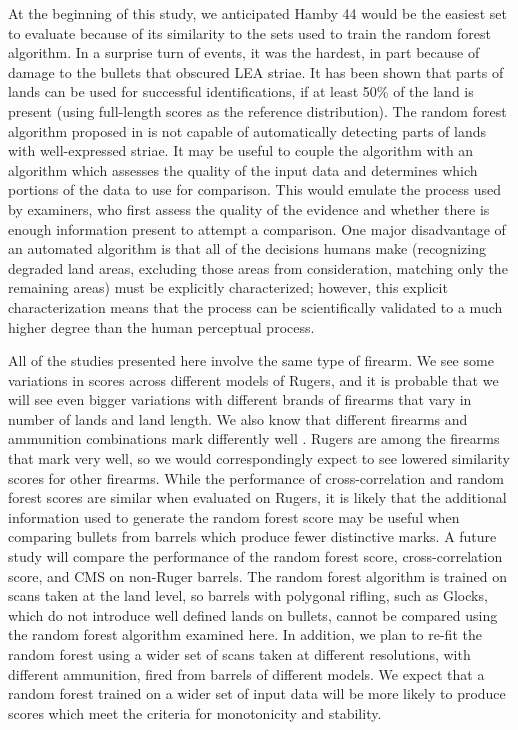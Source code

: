 \documentclass[doubleblind]{elsarticle}\usepackage[]{graphicx}\usepackage[]{color}
\begin{document}
At the beginning of this study, we anticipated Hamby 44 would be the easiest set to evaluate because of its similarity to the sets used to train the random forest algorithm. In a surprise turn of events, it was the hardest, in part because of damage to the bullets that obscured LEA striae. It has been shown \citet{lpr2} that parts of lands can be used for successful identifications, if at least 50\% of the land is present (using full-length scores as the reference distribution). The random forest algorithm proposed in \citet{aoas2} is not capable of automatically detecting parts of lands with well-expressed striae. It may be useful to couple the \citet{aoas2} algorithm with an algorithm which assesses the quality of the input data and determines which portions of the data to use for comparison. This would emulate the process used by examiners, who first assess the quality of the evidence and whether there is enough information present to attempt a comparison. One major disadvantage of an automated algorithm is that all of the decisions humans make (recognizing degraded land areas, excluding those areas from consideration, matching only the remaining areas) must be explicitly characterized; however, this explicit characterization means that the process can be scientifically validated to a much higher degree than the human perceptual process. 

All of the studies presented here involve the same type of firearm. We see some variations in scores across different models of Rugers, and it is probable that we will see even bigger variations with different brands of firearms that vary in number of lands and land length. We also know that different firearms and ammunition combinations mark differently well \citep{boltonkingPreventingMiscarriagesJustice2016, bonfantiInfluenc1999}. Rugers are among the firearms that mark very well, so we would correspondingly expect to see lowered similarity scores for other firearms. While the performance of cross-correlation and random forest scores are similar when evaluated on Rugers, it is likely that the additional information used to generate the random forest score may be useful when comparing bullets from barrels which produce fewer distinctive marks. A future study will compare the performance of the random forest score, cross-correlation score, and CMS on non-Ruger barrels. The random forest algorithm is trained on scans taken at the land level, so barrels with polygonal rifling, such as Glocks, which do not introduce well defined lands on bullets, cannot be compared using the random forest algorithm examined here. In addition, we plan to re-fit the random forest using a wider set of scans taken at different resolutions, with different ammunition, fired from barrels of different models. We expect that a random forest trained on a wider set of input data will be more likely to produce scores which meet the criteria for monotonicity and stability. 
\end{document}
